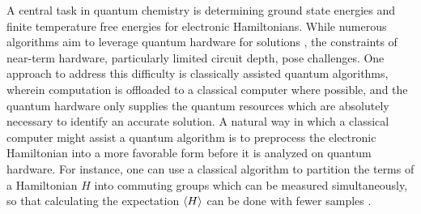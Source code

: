 \documentclass[a4paper,accepted=2024-07-10]{quantumarticle}
\begin{document}
\maketitle

A central task in quantum chemistry is determining ground state energies and finite temperature free energies for electronic Hamiltonians. While numerous algorithms aim to leverage quantum hardware for solutions \cite{VQE,Yuan2019theoryofvariational,2019arXiv190911097Y,QPE}, the constraints of near-term hardware, particularly limited circuit depth, pose challenges. One approach to address this difficulty is classically assisted quantum algorithms, wherein computation is offloaded to a classical computer where possible, and the quantum hardware only supplies the quantum resources which are absolutely necessary to identify an accurate solution. A natural way in which a classical computer might assist a quantum algorithm is to preprocess the electronic Hamiltonian into a more favorable form before it is analyzed on quantum hardware. For instance, one can use a classical algorithm to partition the terms of a Hamiltonian $H$ into commuting groups which can be measured simultaneously, so that calculating the expectation $\expval{H}$ can be done with fewer samples \cite{verteletskyi2020}. 
\end{document}
